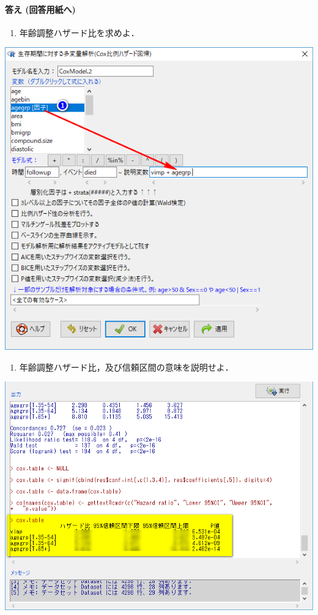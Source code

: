 \documentclass[11pt,]{problemset}
\providecommand{\tightlist}{%
  \setlength{\itemsep}{0pt}\setlength{\parskip}{0pt}}
\let\oldparagraph\paragraph
\renewcommand{\paragraph}[1]{\oldparagraph{#1}\mbox{}}
\begin{document}
\hypertarget{--8}{%
\paragraph{答え (回答用紙へ)}\label{--8}}

\begin{enumerate}
\def\labelenumi{\arabic{enumi}.}
\setcounter{enumi}{5}
\tightlist
\item
  年齢調整ハザード比を求めよ．
\end{enumerate}

\begin{center}\includegraphics[width=0.6\linewidth,height=0.4\textheight]{pic/survival18} \end{center}

\begin{enumerate}
\def\labelenumi{\arabic{enumi}.}
\setcounter{enumi}{6}
\tightlist
\item
  年齢調整ハザード比，及び信頼区間の意味を説明せよ．
\end{enumerate}

\begin{center}\includegraphics[width=0.6\linewidth,height=0.4\textheight]{pic/survival19cut} \end{center}
\end{document}
